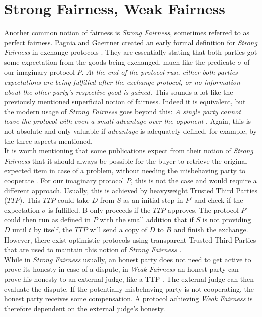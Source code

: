 \documentclass{cacthesis}
\begin{document}
        \section{Strong Fairness, Weak Fairness}
        Another common notion of fairness is \textit{Strong Fairness}, sometimes referred to as perfect fairness. Pagnia and Gaertner created an early formal definition for \textit{Strong Fairness} in exchange protocols \cite{Pagnia99onthe}. They are essentially stating that both parties got some expectation from the goods being exchanged, much like the predicate $\sigma$ of our imaginary protocol $P$. \textit{At the end of the protocol run, either both parties expectations are being fulfilled after the exchange protocol, or no information about the other party's respective good is gained.} This sounds a lot like the previously mentioned superficial notion of fairness. Indeed it is equivalent, but the modern usage of \textit{Strong Fairness} goes beyond this: \textit{A single party cannot leave the protocol with even a small advantage over the opponent} \cite{DELGADOSEGURA2020832}. Again, this is not absolute and only valuable if \textit{advantage} is adequately defined, for example, by the three aspects mentioned. \\
        It is worth mentioning that some publications expect from their notion of \textit{Strong Fairness} that it should always be possible for the buyer to retrieve the original expected item in case of a problem, without needing the misbehaving party to cooperate \cite{DELGADOSEGURA2020832}. For our imaginary protocol $P$, this is not the case and would require a different approach. Usually, this is achieved by heavyweight Trusted Third Parties ($TTP$). This $TTP$ could take $D$ from $S$ as an initial step in $P'$ and check if the expectation $\sigma$ is fulfilled. B only proceeds if the $TTP$ approves. The protocol $P'$ could then run as defined in $P$ with the small addition that if $S$ is not providing $D$ until $t$ by itself, the $TTP$ will send a copy of $D$ to $B$ and finish the exchange. However, there exist optimistic protocols using transparent Trusted Third Parties that are used to maintain this notion of \textit{Strong Fairness} \cite{6982058} \cite{10.1007/3-540-36552-4_31}. \\
        While in \textit{Strong Fairness} usually, an honest party does not need to get active to prove its honesty in case of a dispute, in \textit{Weak Fairness} an honest party can prove his honesty to an external judge, like a TTP \cite{10.1007/3-540-36552-4_31}. The external judge can then evaluate the dispute. If the potentially misbehaving party is not cooperating, the honest party receives some compensation. A protocol achieving \textit{Weak Fairness} is therefore dependent on the external judge's honesty.
        
\end{document}
